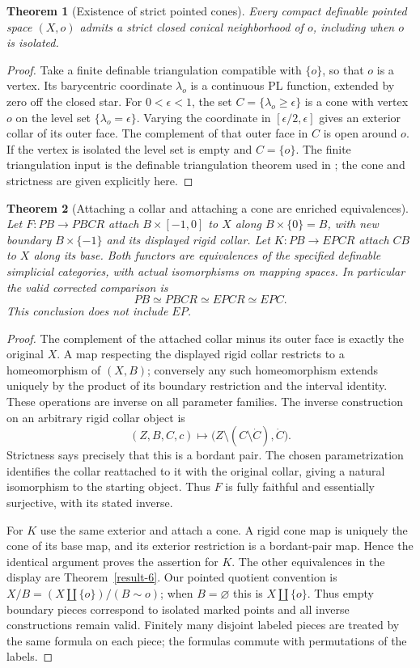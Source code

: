 \documentclass[11pt,a4paper]{article}
\newtheorem{theorem}{Theorem}[section]
\theoremstyle{definition}
\begin{document}
\begin{theorem}[Existence of strict pointed cones]\label{result-9}
Every compact definable pointed space $(X,o)$ admits a strict closed
conical neighborhood of $o$, including when $o$ is isolated.
\end{theorem}
\begin{proof}
Take a finite definable triangulation compatible with $\{o\}$, so that
$o$ is a vertex. Its barycentric coordinate $\lambda_o$ is a continuous
PL function, extended by zero off the closed star. For $0<\epsilon<1$,
the set $C=\{\lambda_o\ge\epsilon\}$ is a cone with vertex $o$ on the
level set $\{\lambda_o=\epsilon\}$. Varying the coordinate in
$[\epsilon/2,\epsilon]$ gives an exterior collar of its outer face.
The complement of that outer face in $C$ is open around $o$. If the
vertex is isolated the level set is empty and $C=\{o\}$. The finite
triangulation input is the definable triangulation theorem used in
\cite[\S1]{Shiota2010}; the cone and strictness are given explicitly here.
\end{proof}

\begin{theorem}[Attaching a collar and attaching a cone are enriched equivalences]\label{result-10}
Let $F:PB\to PBCR$ attach $B\times[-1,0]$ to $X$ along
$B\times\{0\}=B$, with new boundary $B\times\{-1\}$ and its
displayed rigid collar. Let $K:PB\to EPCR$ attach $CB$ to $X$
along its base. Both functors are equivalences of the specified
definable simplicial categories, with actual isomorphisms on mapping
spaces. In particular the valid corrected comparison is
\[
 PB\simeq PBCR\simeq EPCR\simeq EPC.
\]
This conclusion does not include $EP$.
\end{theorem}
\begin{proof}
The complement of the attached collar minus its outer face is exactly
the original $X$. A map respecting the displayed rigid collar restricts
to a homeomorphism of $(X,B)$; conversely any such homeomorphism extends
uniquely by the product of its boundary restriction and the interval
identity. These operations are inverse on all parameter families.
The inverse construction on an arbitrary rigid collar object is
\[
 (Z,B,C,c)\longmapsto
 \bigl(Z\setminus(C\setminus\dot C),\dot C\bigr).
\]
Strictness says precisely that this is a bordant pair. The chosen
parametrization identifies the collar reattached to it with the
original collar, giving a natural isomorphism to the starting object.
Thus $F$ is fully faithful and essentially surjective, with its stated
inverse.

For $K$ use the same exterior and attach a cone. A rigid cone map is
uniquely the cone of its base map, and its exterior restriction is a
bordant-pair map. Hence the identical argument proves the assertion
for $K$. The other equivalences in the display are Theorem~\ref{result-6}. Our pointed
quotient convention is $X/B=(X\amalg\{o\})/(B\sim o)$; when
$B=\varnothing$ this is $X\amalg\{o\}$. Thus empty boundary pieces
correspond to isolated marked points and all inverse constructions
remain valid. Finitely many disjoint labeled pieces are treated by
the same formula on each piece; the formulas commute with permutations
of the labels.
\end{proof}
\end{document}
